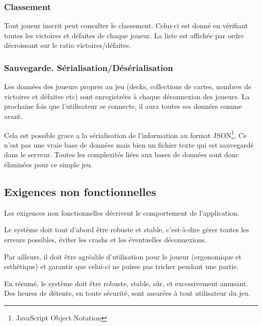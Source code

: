 \documentclass[11pt,a4paper]{article}
\begin{document}
\subsubsection*{Classement}

Tout joueur inscrit peut consulter le classement. Celui-ci est donné en
vérifiant toutes les victoires et défaites de chaque joueur. La liste
est affichée par ordre décroissant sur le ratio victoires/défaites.

\subsubsection*{Sauvegarde. Sérialisation/Désérialisation}

Les données des joueurs propres au jeu (decks,
collections de cartes, nombres de victoires et défaites etc) sont
enregistrées à chaque déconnexion des joueurs. La prochaine fois que
l'utilisateur se connecte, il aura toutes ses données comme avant.

Cela est possible grace a la sérialisation de l'information au format
JSON\footnote{JavaScript Object Notation}. Ce n'est pas une vraie base
de données mais bien un fichier texte qui est sauvegardé dans le
serveur. Toutes les complexités liées aux bases de données sont donc éliminées pour
ce simple jeu.





\subsection{Exigences non fonctionnelles}
\label{sec:exi-nonfonc-sys}

Les exigences non fonctionnelles décrivent le comportement de
l'application.

\medbreak

Le système doit tout d'abord être robuste et stable, c'est-à-dire
gérer toutes les erreurs possibles, éviter les crashs et les éventuelles
déconnexions.

\medbreak

Par ailleurs, il doit être agréable d'utilisation pour le joueur
(ergonomique et esthétique) et garantir que celui-ci ne puisse
pas tricher pendant une partie.

\medbreak

En résumé, le système doit être robuste, stable, sûr, et excessivement amusant. Des
heures de détente, en toute sécurité, sont assurées à tout utilisateur du jeu.
\end{document}
